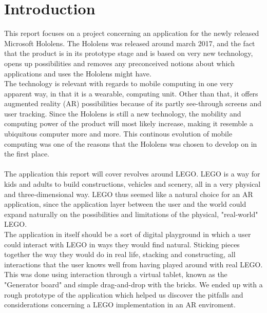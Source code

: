 
\section{Introduction}
This report focuses on a project concerning an application for the newly released Microsoft Hololens. The Hololens was released around march 2017, and the fact that the product is in its prototype stage and is based on very new technology, opens up possibilities and removes any preconceived notions about which applications and uses the Hololens might have.\\
The technology is relevant with regards to mobile computing in one very apparent way, in that it is a wearable, computing unit. Other than that, it offers augmented reality (AR) possibilities because of its partly see-through screens and user tracking. Since the Hololens is still a new technology, the mobility and computing power of the product will most likely increase, making it resemble a ubiquitous computer more and more. This continous evolution of mobile computing was one of the reasons that the Hololens was chosen to develop on in the first place.\\\\
The application this report will cover revolves around LEGO. LEGO is a way for kids and adults to build constructions, vehicles and scenery, all in a very physical and three-dimensional way. LEGO thus seemed like a natural choice for an AR application, since the application layer between the user and the world could expand naturally on the possibilities and limitations of the physical, "real-world" LEGO.\\
The application in itself should be a sort of digital playground in which a user could interact with LEGO in ways they would find natural. Sticking pieces together the way they would do in real life, stacking and constructing, all interactions that the user knows well from having played around with real LEGO. This was done using interaction through a virtual tablet, known as the "Generator board" and simple drag-and-drop with the bricks. We ended up with a rough prototype of the application which helped us discover the pitfalls and considerations concerning a LEGO implementation in an AR enviroment.